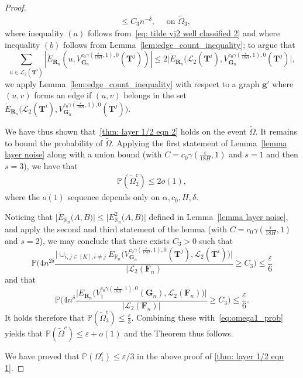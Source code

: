 \documentclass[twoside,11pt]{article}
\theoremstyle{remark}
\begin{document}
\begin{proof}
\begin{align*}
&\leq C_3 n^{-\delta},\quad \text{ on $\tilde{\Omega}_3$},
\end{align*}
\endgroup
where inequality $(a)$ follows from~\eqref{eq: tilde vj2 well classified 2} and where inequality $(b)$ follows from Lemma~\ref{lem:edge_count_inequality}; to argue that 
\[
\sum_{u \in \mathcal{L}_2(\bm{T}^i)} | \dot{E}_{\bm{R}_n}(u, V_{\bm G_n}^{c_0 \gamma(\frac{\varepsilon}{18H}, 1), 0}(\bm{T}^j))| \leq 2 \bigl| \dot{E}_{\bm{R}_n}\bigl( \mathcal{L}_2(\bm{T}^i), V_{\bm G_n}^{c_0 \gamma(\frac{\varepsilon}{18H}, 1), 0}(\bm{T}^j) \bigr|,
\]
we apply Lemma~\ref{lem:edge_count_inequality} with respect to a graph $\bm{g}'$ where $(u, v)$ forms an edge if $(u, v)$ belongs in the set $\dot{E}_{\bm{R}_n}\bigl( \mathcal{L}_2(\bm{T}^i), V_{\bm G_n}^{c_0 \gamma(\frac{\varepsilon}{18H}, 1), 0}(\bm{T}^j) \bigr)$. 

We have thus shown that~\eqref{thm: layer 1/2 eqn 2} holds on the event $\tilde{\Omega}$. It remains to bound the probability of $\tilde{\Omega}$. Applying the first statement of Lemma~\ref{lemma layer noise} along with a union bound (with $C = c_0 \gamma(\frac{\varepsilon}{18H}, 1)$ and $s = 1$ and then $s=3$), we have that
\begin{align}
\mathbb{P}(\tilde{\Omega}_2^c) \leq 2 o(1),
\end{align}
where the $o(1)$ sequence depends only on $\alpha, c_0, H, \delta$. 

Noticing that $\bigl|\dot{E}_{\mathbb{R}_n}\bigl(A,B\bigr)\bigr|\leq \bigl|{E}^2_{\mathbb{R}_n}\bigl(A,B\bigr)\bigr|$ defined in Lemma~\ref{lemma layer noise}, and apply the second and third statement of the lemma (with $C = c_0 \gamma(\frac{\varepsilon}{18H}, 1)$ and $s = 2$), we may conclude that there exists $C_3 > 0$ such that
\[
\mathbb{P} \biggl( 4n^{2\delta} \frac{ \bigl| \cup_{i,j \in [K], i\neq j} \dot{E}_{\mathbb{R}_n}\bigl( V_{\bm{G}_n}^{c_0 \gamma( \frac{\varepsilon}{18H}, 1), 0}(\bm{T}^j), \mathcal{L}_2(\bm{T}^i) \bigr) \bigr|}{|\mathcal{L}_2(\bm{F}_n)} \geq C_3\biggr) \leq \frac{\varepsilon}{6}
\]
and that 
\[
\mathbb{P}\biggl( 4n^{\delta} \frac{ \bigl| E_{\bm{R}_n}\bigl( V_1^{c_0 \gamma(\frac{\varepsilon}{18H}, 1), 0}(\bm{G}_n), \mathcal{L}_2(\bm{F}_n) \bigr) \bigr|}{ | \mathcal{L}_2(\bm{F}_n) |}\geq C_3 \biggr) \leq \frac{\varepsilon}{6}.
\]
It holds therefore that $\mathbb{P}(\tilde{\Omega}_3^c) \leq \frac{\varepsilon}{3}$. Combining these with~\eqref{eq:omega1_prob} yields that $\mathbb{P}(\tilde{\Omega}^c) \leq \varepsilon + o(1)$ and the Theorem thus follows. 


We have proved that $\mathbb{P}\left(\Omega_1^c\right) \le \varepsilon/3$ in the above proof of \eqref{thm: layer 1/2 eqn 1}. 
\end{proof}
\end{document}
